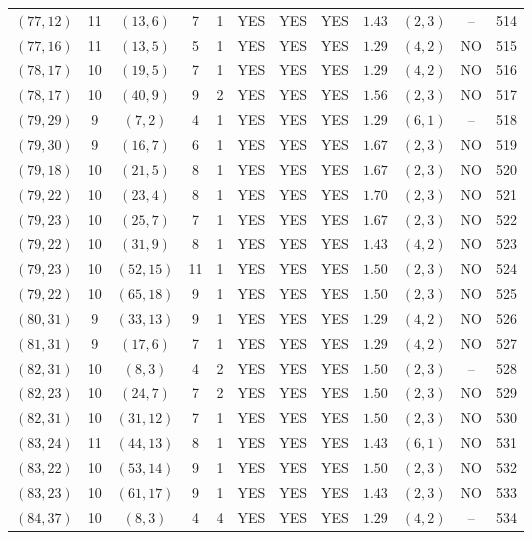 \begin{longtable}{|c|c|c|c|c|c|c|c|c|c|c|c|}
$(77,12)$ & 11 & $(13,6)$ & 7 & 1 & YES & YES & YES & $1.43$ & $(2,3)$ & -- & 514\\
$(77,16)$ & 11 & $(13,5)$ & 5 & 1 & YES & YES & YES & $1.29$ & $(4,2)$ & NO & 515\\
$(78,17)$ & 10 & $(19,5)$ & 7 & 1 & YES & YES & YES & $1.29$ & $(4,2)$ & NO & 516\\
$(78,17)$ & 10 & $(40,9)$ & 9 & 2 & YES & YES & YES & $1.56$ & $(2,3)$ & NO & 517\\
$(79,29)$ & 9 & $(7,2)$ & 4 & 1 & YES & YES & YES & $1.29$ & $(6,1)$ & -- & 518\\
$(79,30)$ & 9 & $(16,7)$ & 6 & 1 & YES & YES & YES & $1.67$ & $(2,3)$ & NO & 519\\
$(79,18)$ & 10 & $(21,5)$ & 8 & 1 & YES & YES & YES & $1.67$ & $(2,3)$ & NO & 520\\
$(79,22)$ & 10 & $(23,4)$ & 8 & 1 & YES & YES & YES & $1.70$ & $(2,3)$ & NO & 521\\
$(79,23)$ & 10 & $(25,7)$ & 7 & 1 & YES & YES & YES & $1.67$ & $(2,3)$ & NO & 522\\
$(79,22)$ & 10 & $(31,9)$ & 8 & 1 & YES & YES & YES & $1.43$ & $(4,2)$ & NO & 523\\
$(79,23)$ & 10 & $(52,15)$ & 11 & 1 & YES & YES & YES & $1.50$ & $(2,3)$ & NO & 524\\
$(79,22)$ & 10 & $(65,18)$ & 9 & 1 & YES & YES & YES & $1.50$ & $(2,3)$ & NO & 525\\
$(80,31)$ & 9 & $(33,13)$ & 9 & 1 & YES & YES & YES & $1.29$ & $(4,2)$ & NO & 526\\
$(81,31)$ & 9 & $(17,6)$ & 7 & 1 & YES & YES & YES & $1.29$ & $(4,2)$ & NO & 527\\
$(82,31)$ & 10 & $(8,3)$ & 4 & 2 & YES & YES & YES & $1.50$ & $(2,3)$ & -- & 528\\
$(82,23)$ & 10 & $(24,7)$ & 7 & 2 & YES & YES & YES & $1.50$ & $(2,3)$ & NO & 529\\
$(82,31)$ & 10 & $(31,12)$ & 7 & 1 & YES & YES & YES & $1.50$ & $(2,3)$ & NO & 530\\
$(83,24)$ & 11 & $(44,13)$ & 8 & 1 & YES & YES & YES & $1.43$ & $(6,1)$ & NO & 531\\
$(83,22)$ & 10 & $(53,14)$ & 9 & 1 & YES & YES & YES & $1.50$ & $(2,3)$ & NO & 532\\
$(83,23)$ & 10 & $(61,17)$ & 9 & 1 & YES & YES & YES & $1.43$ & $(2,3)$ & NO & 533\\
$(84,37)$ & 10 & $(8,3)$ & 4 & 4 & YES & YES & YES & $1.29$ & $(4,2)$ & -- & 534\\

\end{longtable}
